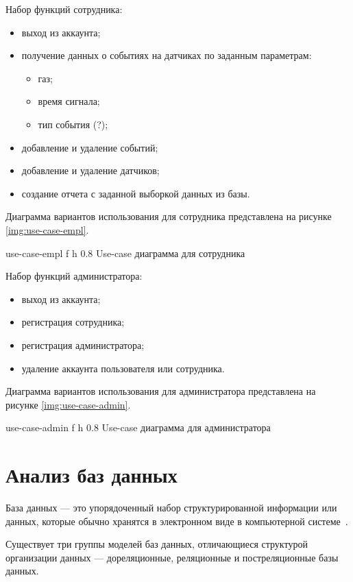 Набор функций сотрудника:

\begin{itemize}
	\item выход из аккаунта;
        \item получение данных о событиях на датчиках по заданным параметрам:
        \begin{itemize}
            \item газ;
            \item время сигнала;
            \item тип события (?);
        \end{itemize}
        \item добавление и удаление событий;
        \item добавление и удаление датчиков;
        \item создание отчета с заданной выборкой данных из базы.
\end{itemize}

Диаграмма вариантов использования для сотрудника представлена на рисунке \ref{img:use-case-empl}.

    {use-case-empl}
    {f}
    {h}
    {0.8\textwidth}
    {Use-case диаграмма для сотрудника}

Набор функций администратора:

\begin{itemize}
	\item выход из аккаунта;
        \item регистрация сотрудника;
        \item регистрация администратора;
        \item удаление аккаунта пользователя или сотрудника.
\end{itemize}

Диаграмма вариантов использования для администратора представлена на рисунке \ref{img:use-case-admin}.

    {use-case-admin}
    {f}
    {h}
    {0.8\textwidth}
    {Use-case диаграмма для администратора}
    

\section{Анализ баз данных}

База данных --- это упорядоченный набор структурированной информации или данных, которые обычно хранятся в электронном виде в компьютерной системе~\cite{db}.

Существует три группы моделей баз данных, отличающиеся структурой организации данных --- дореляционные, реляционные и постреляционные базы данных.

